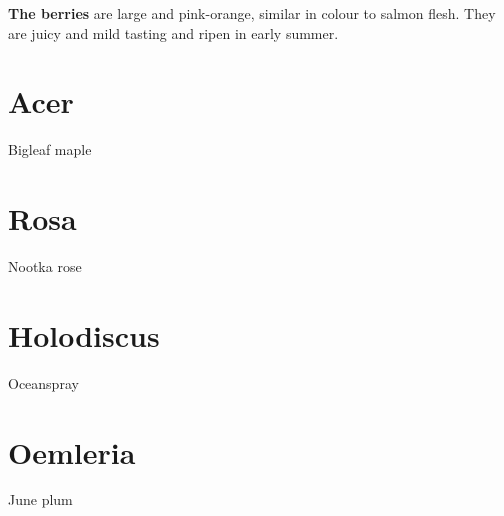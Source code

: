 \textbf{The berries} are large and pink-orange, similar in colour to salmon flesh. They are juicy and mild tasting and ripen in early summer.


\section{Acer}

Bigleaf maple

\section{Rosa}

Nootka rose

\section{Holodiscus}

Oceanspray

\section{Oemleria}

June plum

